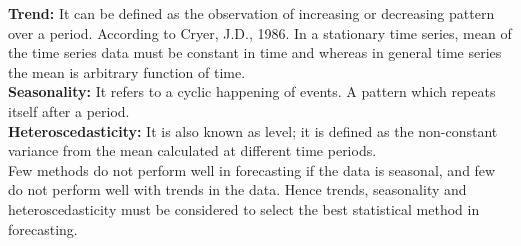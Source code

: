 \documentclass[12pt,a4paper]{article}
\begin{document}
\begin{flushleft}
		\textbf{Trend:} It can be defined as the observation of increasing or decreasing pattern over a period. According to Cryer, J.D., 1986. In a stationary time series, mean of the time series data must be constant in time and whereas in general time series the mean is arbitrary function of time.\\
		
		\textbf{Seasonality:} It refers to a cyclic happening of events. A pattern which repeats itself after a period.\\
		
		\textbf{Heteroscedasticity:} It is also known as level; it is defined as the non-constant variance from the mean calculated at different time periods.\\
		
		Few methods do not perform well in forecasting if the data is seasonal, and few do not perform well with trends in the data. Hence trends, seasonality and heteroscedasticity must be considered to select the best statistical method in forecasting. 
		

\end{flushleft}
\end{document}
